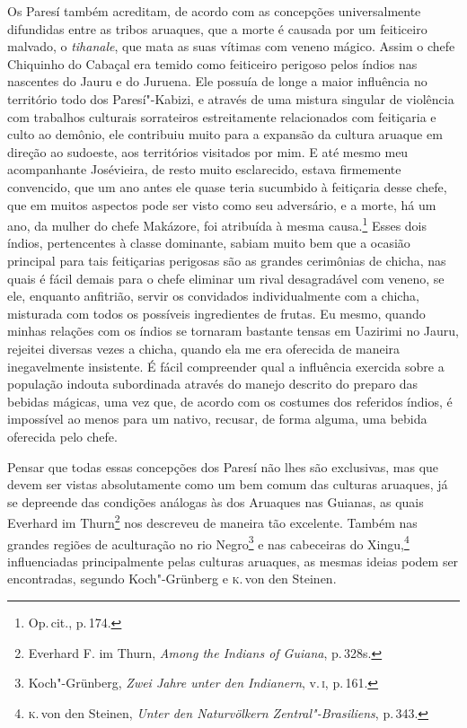 Os Paresí também acreditam, de acordo com as concepções universalmente
difundidas entre as tribos aruaques, que a morte é causada por um
feiticeiro malvado, o \textit{tihanale}, que mata as suas vítimas com
veneno mágico. Assim o chefe Chiquinho do Cabaçal era temido como
feiticeiro perigoso pelos índios nas nascentes do Jauru e do Juruena.
Ele possuía de longe a maior influência no território todo dos
Paresí"-Kabizi, e através de uma mistura singular de violência com
trabalhos culturais sorrateiros estreitamente relacionados com
feitiçaria e culto ao demônio, ele contribuiu muito para a expansão da
cultura aruaque em direção ao sudoeste, aos territórios visitados por
mim. E até mesmo meu acompanhante Josévieira, de resto muito
esclarecido, estava firmemente convencido, que um ano antes ele quase
teria sucumbido à feitiçaria desse chefe, que em muitos aspectos pode
ser visto como seu adversário, e a morte, há um ano, da mulher do chefe
Makázore, foi atribuída à mesma causa.\footnote{Op.\,cit., p.\,174.} Esses dois índios, pertencentes à classe dominante, sabiam
muito bem que a ocasião principal para tais feitiçarias perigosas são
as grandes cerimônias de chicha, nas quais é fácil demais para o chefe
eliminar um rival desagradável com veneno, se ele, enquanto anfitrião,
servir os convidados individualmente com a chicha, misturada com todos
os possíveis ingredientes de frutas. Eu mesmo, quando minhas relações
com os índios se tornaram bastante tensas em Uazirimi no Jauru,
rejeitei diversas vezes a chicha, quando ela me era oferecida de
maneira inegavelmente insistente. É fácil compreender qual a influência
exercida sobre a população indouta subordinada através do manejo
descrito do preparo das bebidas mágicas, uma vez que, de acordo com os
costumes dos referidos índios, é impossível ao menos para um nativo,
recusar, de forma alguma, uma bebida oferecida pelo chefe.

Pensar que todas essas concepções dos Paresí não lhes são exclusivas,
mas que devem ser vistas absolutamente como um bem comum das culturas
aruaques, já se depreende das condições análogas às dos Aruaques nas
Guianas, as quais Everhard im Thurn\footnote{Everhard F. im Thurn,
  \textit{Among the Indians of Guiana}, p.\,328s.} nos descreveu de
maneira tão excelente. Também nas grandes regiões de aculturação no rio
Negro\footnote{Koch"-Grünberg, \textit{Zwei Jahre unter den Indianern}, v.\,\textsc{i}, p.\,161.} e nas cabeceiras do Xingu,\footnote{\textsc{k}.\,von den
  Steinen, \textit{Unter den Naturvölkern Zentral"-Brasiliens}, p.\,343.}
influenciadas principalmente pelas culturas aruaques, as mesmas ideias
podem ser encontradas, segundo Koch"-Grünberg e \textsc{k}.\,von den Steinen.

